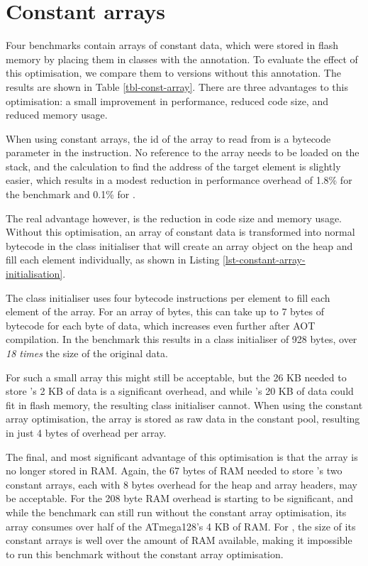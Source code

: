 \section{Constant arrays}
\label{sec-evaluation-const-array}


Four benchmarks contain arrays of constant data, which were stored in flash memory by placing them in classes with the  annotation. To evaluate the effect of this optimisation, we compare them to versions without this annotation. The results are shown in Table \ref{tbl-const-array}. There are three advantages to this optimisation: a small improvement in performance, reduced code size, and reduced memory usage.

When using constant arrays, the id of the array to read from is a bytecode parameter in the  instruction. No reference to the array needs to be loaded on the stack, and the calculation to find the address of the target element is slightly easier, which results in a modest reduction in performance overhead of 1.8\% for the  benchmark and 0.1\% for .

The real advantage however, is the reduction in code size and memory usage. Without this optimisation, an array of constant data is transformed into normal bytecode in the class initialiser that will create an array object on the heap and fill each element individually, as shown in Listing \ref{lst-constant-array-initialisation}.

The class initialiser uses four bytecode instructions per element to fill each element of the array. For an array of bytes, this can take up to 7 bytes of bytecode for each byte of data, which increases even further after AOT compilation. In the  benchmark this results in a class initialiser of 928 bytes, over \emph{18 times} the size of the original data. 

For such a small array this might still be acceptable, but the 26 KB needed to store 's 2 KB of data is a significant overhead, and while 's 20 KB of data could fit in flash memory, the resulting class initialiser cannot. When using the constant array optimisation, the array is stored as raw data in the constant pool, resulting in just 4 bytes of overhead per array.

The final, and most significant advantage of this optimisation is that the array is no longer stored in RAM. Again, the 67 bytes of RAM needed to store 's two constant arrays, each with 8 bytes overhead for the heap and array headers, may be acceptable. For  the 208 byte RAM overhead is starting to be significant, and while the  benchmark can still run without the constant array optimisation, its array consumes over half of the ATmega128's 4 KB of RAM. For , the size of its constant arrays is well over the amount of RAM available, making it impossible to run this benchmark without the constant array optimisation.